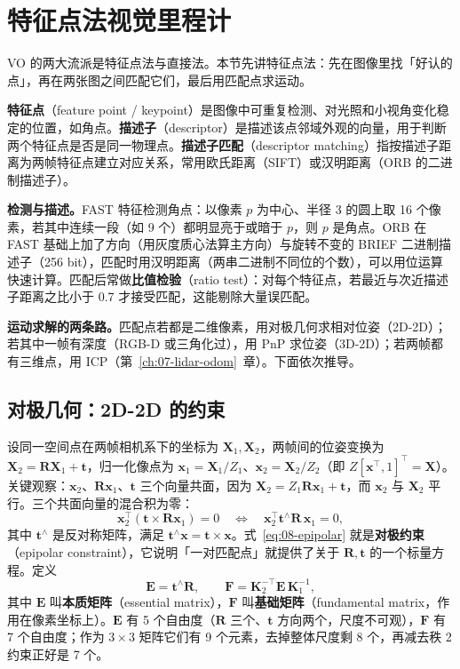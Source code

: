 \section{特征点法视觉里程计}\label{sec:08-feature}

VO 的两大流派是特征点法与直接法。本节先讲特征点法：先在图像里找「好认的点」，再在两张图之间匹配它们，最后用匹配点求运动。

\begin{definition}[特征点与描述子匹配]
\textbf{特征点}（feature point / keypoint）是图像中可重复检测、对光照和小视角变化稳定的位置，如角点。\textbf{描述子}（descriptor）是描述该点邻域外观的向量，用于判断两个特征点是否是同一物理点。\textbf{描述子匹配}（descriptor matching）指按描述子距离为两帧特征点建立对应关系，常用欧氏距离（SIFT）或汉明距离（ORB 的二进制描述子）。
\end{definition}

\textbf{检测与描述。}FAST 特征检测角点：以像素 $p$ 为中心、半径 3 的圆上取 16 个像素，若其中连续一段（如 9 个）都明显亮于或暗于 $p$，则 $p$ 是角点。ORB 在 FAST 基础上加了方向（用灰度质心法算主方向）与旋转不变的 BRIEF 二进制描述子（256 bit），匹配时用汉明距离（两串二进制不同位的个数），可以用位运算快速计算。匹配后常做\textbf{比值检验}（ratio test）：对每个特征点，若最近与次近描述子距离之比小于 0.7 才接受匹配，这能剔除大量误匹配。

\textbf{运动求解的两条路。}匹配点若都是二维像素，用对极几何求相对位姿（2D-2D）；若其中一帧有深度（RGB-D 或三角化过），用 PnP 求位姿（3D-2D）；若两帧都有三维点，用 ICP（第~\ref{ch:07-lidar-odom}~章）。下面依次推导。

\subsection{对极几何：2D-2D 的约束}

设同一空间点在两帧相机系下的坐标为 $\bm{X}_1,\bm{X}_2$，两帧间的位姿变换为 $\bm{X}_2=\bm{R}\bm{X}_1+\bm{t}$，归一化像点为 $\bm{x}_1=\bm{X}_1/Z_1$、$\bm{x}_2=\bm{X}_2/Z_2$（即 $Z[\bm{x}^{\top},1]^{\top}=\bm{X}$）。关键观察：$\bm{x}_2$、$\bm{R}\bm{x}_1$、$\bm{t}$ 三个向量共面，因为 $\bm{X}_2=Z_1\bm{R}\bm{x}_1+\bm{t}$，而 $\bm{x}_2$ 与 $\bm{X}_2$ 平行。三个共面向量的混合积为零：
\begin{equation}
  \bm{x}_2^{\top}\left(\bm{t}\times\bm{R}\bm{x}_1\right)=0
  \quad\Longleftrightarrow\quad
  \bm{x}_2^{\top}\bm{t}^{\wedge}\bm{R}\,\bm{x}_1=0,
  \label{eq:08-epipolar}
\end{equation}
其中 $\bm{t}^{\wedge}$ 是反对称矩阵，满足 $\bm{t}^{\wedge}\bm{x}=\bm{t}\times\bm{x}$。式~\eqref{eq:08-epipolar} 就是\textbf{对极约束}（epipolar constraint），它说明「一对匹配点」就提供了关于 $\bm{R},\bm{t}$ 的一个标量方程。定义
\begin{equation}
  \bm{E}=\bm{t}^{\wedge}\bm{R},\qquad
  \bm{F}=\bm{K}_2^{-\top}\bm{E}\,\bm{K}_1^{-1},
  \label{eq:08-E-F}
\end{equation}
其中 $\bm{E}$ 叫\textbf{本质矩阵}（essential matrix），$\bm{F}$ 叫\textbf{基础矩阵}（fundamental matrix，作用在像素坐标上）。$\bm{E}$ 有 5 个自由度（$\bm{R}$ 三个、$\bm{t}$ 方向两个，尺度不可观），$\bm{F}$ 有 7 个自由度；作为 $3\times3$ 矩阵它们有 9 个元素，去掉整体尺度剩 8 个，再减去秩 2 约束正好是 7 个。

